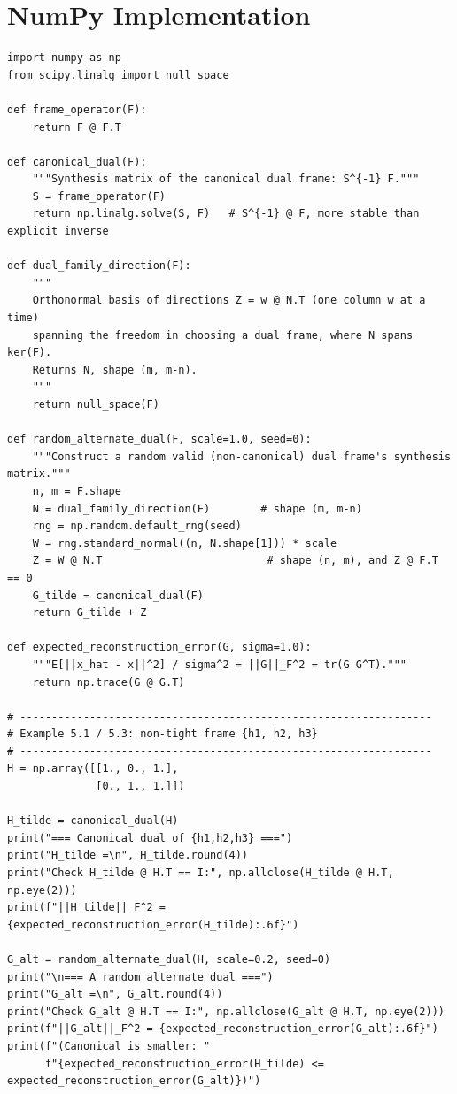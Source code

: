 \section{NumPy Implementation}
\label{sec:numpy-dual-frames}

\begin{lstlisting}[caption={Canonical and alternate dual frames, and stability comparison}]
import numpy as np
from scipy.linalg import null_space

def frame_operator(F):
    return F @ F.T

def canonical_dual(F):
    """Synthesis matrix of the canonical dual frame: S^{-1} F."""
    S = frame_operator(F)
    return np.linalg.solve(S, F)   # S^{-1} @ F, more stable than explicit inverse

def dual_family_direction(F):
    """
    Orthonormal basis of directions Z = w @ N.T (one column w at a time)
    spanning the freedom in choosing a dual frame, where N spans ker(F).
    Returns N, shape (m, m-n).
    """
    return null_space(F)

def random_alternate_dual(F, scale=1.0, seed=0):
    """Construct a random valid (non-canonical) dual frame's synthesis matrix."""
    n, m = F.shape
    N = dual_family_direction(F)        # shape (m, m-n)
    rng = np.random.default_rng(seed)
    W = rng.standard_normal((n, N.shape[1])) * scale
    Z = W @ N.T                          # shape (n, m), and Z @ F.T == 0
    G_tilde = canonical_dual(F)
    return G_tilde + Z

def expected_reconstruction_error(G, sigma=1.0):
    """E[||x_hat - x||^2] / sigma^2 = ||G||_F^2 = tr(G G^T)."""
    return np.trace(G @ G.T)

# -----------------------------------------------------------------
# Example 5.1 / 5.3: non-tight frame {h1, h2, h3}
# -----------------------------------------------------------------
H = np.array([[1., 0., 1.],
              [0., 1., 1.]])

H_tilde = canonical_dual(H)
print("=== Canonical dual of {h1,h2,h3} ===")
print("H_tilde =\n", H_tilde.round(4))
print("Check H_tilde @ H.T == I:", np.allclose(H_tilde @ H.T, np.eye(2)))
print(f"||H_tilde||_F^2 = {expected_reconstruction_error(H_tilde):.6f}")

G_alt = random_alternate_dual(H, scale=0.2, seed=0)
print("\n=== A random alternate dual ===")
print("G_alt =\n", G_alt.round(4))
print("Check G_alt @ H.T == I:", np.allclose(G_alt @ H.T, np.eye(2)))
print(f"||G_alt||_F^2 = {expected_reconstruction_error(G_alt):.6f}")
print(f"(Canonical is smaller: "
      f"{expected_reconstruction_error(H_tilde) <= expected_reconstruction_error(G_alt)})")


\end{lstlisting}
